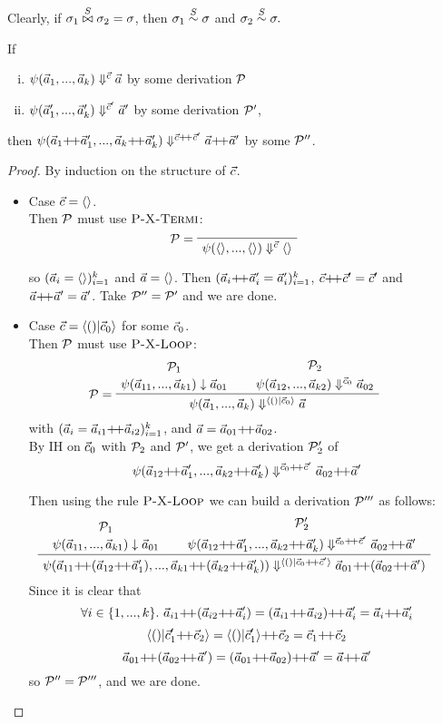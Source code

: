 Clearly, if $\sigma_1 \stackrel{S}{\bowtie} \sigma_2 = \sigma$, 
	then $\sigma_1 \stackrel{S}{\sim} \sigma$ and $\sigma_2 \stackrel{S}{\sim} \sigma.$



\begin{lem} \label{lem-psi-join}
	If \begin{enumerate}[(i)]
	 \item $\psi(\vec a_{1},...,\vec a_{k}) \Downarrow^{\vec c} \vec a$ by some derivation $\mathcal{P}$
	 \item $\psi(\vec a'_{1},...,\vec a'_{k}) \Downarrow^{\vec c'} \vec a'$ by some derivation $\mathcal{P}'$,
	\end{enumerate}
	then $\sevalfg{\lcall}{\a_{1} {\++} \a'_{1},...,\a_{k} {\++} \a'_{k}}{\c {\++} \c'}{\a {\++} \a'}$ by some $\mathcal{P}''$.
\end{lem}

\begin{proof}
\def\cc{\c {\++} \c'}
\def\aap#1{\a_{#1} {\++} \a_{#1}'}

	By induction on the structure of $\vec c$. 
	\begin{itemize}
		\item Case $\vec c = \langle \rangle$. \\
		Then $\mathcal{P}$ must use $\textsc{P-X-Termi}$:
		$$\PT{\LeLa{\MP = }
			  \Axiom{\sevalf{\emptyv}{\emptyv}{\c}{\emptyv}}
		  }$$
		
		so $(\vec a_i=\langle \rangle)^k_{i=1}$ and $\vec a = \langle \rangle$.
		Then $\k{\aap{i} = \a_i'}$, $\cc = \c' $ and $\a {\++} \a' = \a'$. Take $\mathcal{P}''
		= \mathcal{P}'$ and we are done. 
		
		\item Case $\c = \< () | \c_0 \'>$ for some $\vec c_0$. \\ 
		Then $\mathcal{P}$ must use $\textsc{P-X-Loop}$: 
		$$
		\PT{
			\UCN{\MP_1}{\block{\a_{11}}{\a_{k1}}{\a_{01}}}
			\UCN{\MP_2}{\sevalf{\a_{12}}{\a_{k2}}{\c_0}{\a_{02}}}
 			\LeLa{\MP = }
			\BC{\sevalf{\a_1}{\a_k}{\< () | \c_0 \'>}{\a}}
		}$$
	    with $\k{\a_i = \vapp{\a_{i1}}{\a_{i2}}}$, and $\a = \a_{01} {\++} \a_{02}$.\\
	    
	    By IH on $\vec c_0$ with $\mathcal{P}_2$ and $\mathcal{P}'$, we get a derivation $\mathcal{P}'_2$ of 
	    $$\sevalfg{\lcall}{\a_{12} {\++} \a_1',...,\a_{k2} {\++} \a_k'}{\c_0 {\++} \c' }{\a_{02} {\++} \a'}$$
	    
	    Then using the rule $\textsc{P-X-Loop}$ we can build a derivation $\mathcal{P}'''$ as follows:
	    	$$
	    \PT{
	    	\UCN{\MP_{1}}{\block{\a_{11}}{\a_{k1}}{\a_{01}}}
	    	\UCN{\MP'_{2}}{\sevalfg{\lcall}{\a_{12} {\++} \a_1',...,\a_{k2} {\++} \a_k'}{\c_0 {\++} \c' }{\a_{02} {\++} \a'}}
	    	\BC{\sevalf{\a_{11} {\++} {(\a_{12} {\++} \a_1')}}
	    		        {\a_{k1} {\++} {(\a_{k2} {\++} \a_k')}}
	    		        {\< () | \c_0 {\++} \c' \'>}
	    		        {\a_{01} {\++} {(\a_{02} {\++} \a')}}}
	    }$$
	    Since it is clear that 
	    $$\forall i \in \{1,...,k\}. \ \a_{i1} {\++} (\a_{i2} {\++} \a_i') = (\a_{i1} {\++} \a_{i2}) {\++} \a_i' = \a_i {\++} \a_i' $$
	    $$ \< () | \c_1' {\++} \c_2 \'> = \< () | \c_1' \'> {\++} \c_2 = \c_1 {\++} \c_2 $$
	    $$ \a_{01} {\++} (\a_{02} {\++} \a') = (\a_{01} {\++} \a_{02}) {\++} \a' = \a {\++}  \a' $$
	    so  $\mathcal{P}'' = \mathcal{P}'''$, and we are done. 
	    

\end{itemize}
\end{proof}
